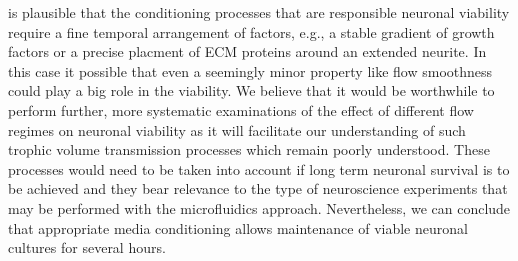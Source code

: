 is plausible that the conditioning processes that are responsible neuronal viability require a fine temporal arrangement of factors, e.g., a stable gradient of growth factors or a precise placment of ECM proteins around an extended neurite. In this case it possible that even a seemingly minor property like flow smoothness could play a big role in the viability. We believe that it would be worthwhile to perform further, more systematic examinations of the effect of different flow regimes on neuronal viability as it will facilitate our understanding of such trophic volume transmission processes which remain poorly understood. These processes would need to be taken into account if long term neuronal survival is to be achieved and they bear relevance to the type of neuroscience experiments that may be performed with the microfluidics approach. Nevertheless, we can conclude that appropriate media conditioning allows maintenance of viable neuronal cultures for several hours.

